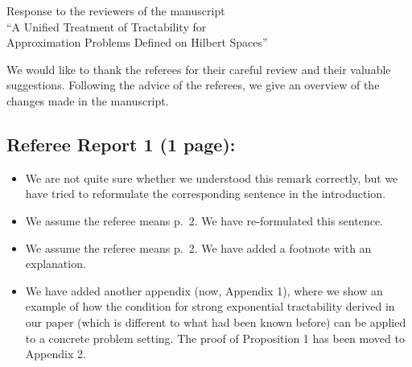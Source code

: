 \documentclass[11pt,a4paper]{article}
\begin{document}
\newtheorem{theorem}{Theorem}
\theoremstyle{definition}
\newtheorem{definition}{Definition}


\begin{center}
    {\Large Response to the reviewers of the manuscript\\``A Unified Treatment of Tractability for \\ Approximation Problems Defined on Hilbert Spaces''}
\end{center}

We would like to thank the referees for their careful review and their valuable suggestions. Following the advice of the referees, we give an overview of the changes made in the manuscript. 

\subsection*{Referee Report 1 (1 page):}
\begin{itemize}
    \item We are not quite sure whether we understood this remark correctly, but we have tried to reformulate the corresponding sentence in the introduction. 
    \item We assume the referee means p.~2. We have re-formulated this sentence. 
    \item We assume the referee means p.~2. We have added a footnote with an explanation. 
    \item We have added another appendix (now, Appendix 1), where we show an example of how the condition for strong exponential tractability derived in our paper (which is different to what had been known before) can be applied to a concrete problem setting. The proof of Proposition 1 has been moved to Appendix 2. 
\end{itemize}
\medskip
\end{document}
